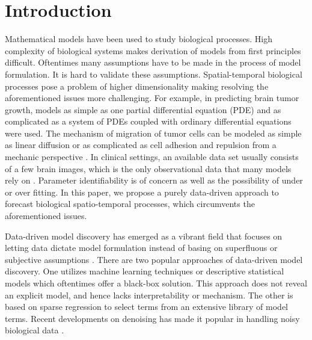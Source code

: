 \documentclass[smallextended,natbib]{svjour3}       %
\begin{document}
\section{Introduction}
\label{intro}
Mathematical models have been used to study biological processes. High complexity of biological systems makes derivation of models from first principles difficult. Oftentimes many assumptions have to be made in the process of model formulation.  It is hard to validate these assumptions. Spatial-temporal biological processes pose a problem of higher dimensionality making resolving the aforementioned issues more challenging. For example, in predicting brain tumor growth, models as simple as one partial differential equation (PDE) \citep{Jackson2015a} and as complicated as a system of PDEs coupled with ordinary differential equations \citep{Eikenberry2009} were used. The mechanism of migration of tumor cells can be modeled as simple as linear diffusion  or as complicated as cell adhesion and repulsion from a mechanic perspective \citep{khain2012migration,aubert2008model}. In clinical settings, an available data set usually consists of a few brain images, which is the only observational data that many models rely on \citep{lipkova2019personalized,Kostelich2011a,Jackson2015a}. Parameter identifiability is of concern as well as the possibility of under or over fitting. In this paper, we propose a purely data-driven approach to forecast biological spatio-temporal processes, which circumvents the aforementioned issues.              

Data-driven model discovery has emerged as a vibrant field that focuses on letting data dictate model formulation instead of basing on superfluous or subjective assumptions \citep{Brunton2019}. There are two popular approaches of data-driven model discovery. One utilizes machine learning techniques or descriptive statistical models which oftentimes offer a black-box solution. This approach does not reveal an explicit model, and hence lacks interpretability or mechanism. The other is based on sparse regression to select terms from an extensive library of model terms. Recent developments on denoising has made it popular in handling noisy biological data \citep{Nardini2020,Lagergren2020a}.
\end{document}
